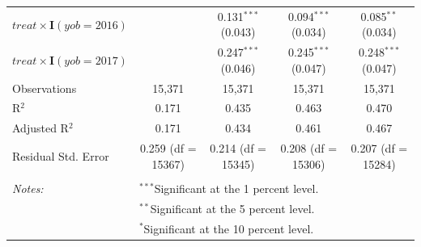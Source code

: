 \begin{table}[H]
\begin{tabular}{@{\extracolsep{5pt}}lcccc}
  $treat \times\mathbf{I}(yob=2016)$ &  & 0.131$^{***}$ (0.043) & 0.094$^{***}$ (0.034) & 0.085$^{**}$ (0.034) \\ 
  $treat \times\mathbf{I}(yob=2017)$ &  & 0.247$^{***}$ (0.046) & 0.245$^{***}$ (0.047) & 0.248$^{***}$ (0.047) \\ 
 Observations & 15,371 & 15,371 & 15,371 & 15,371 \\ 
R$^{2}$ & 0.171 & 0.435 & 0.463 & 0.470 \\ 
Adjusted R$^{2}$ & 0.171 & 0.434 & 0.461 & 0.467 \\ 
Residual Std. Error & 0.259 (df = 15367) & 0.214 (df = 15345) & 0.208 (df = 15306) & 0.207 (df = 15284) \\ 
\hline \\[-1.8ex] 
\textit{Notes:} & \multicolumn{4}{l}{$^{***}$Significant at the 1 percent level.} \\ 
 & \multicolumn{4}{l}{$^{**}$Significant at the 5 percent level.} \\ 
 & \multicolumn{4}{l}{$^{*}$Significant at the 10 percent level.} \\ 
\end{tabular} 
\end{table} 
